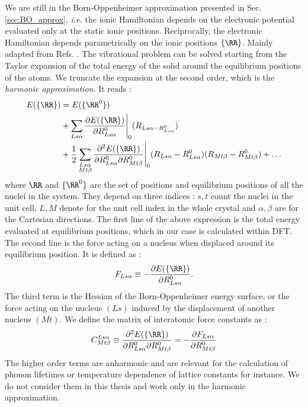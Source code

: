 We are still in the Born-Oppenheimer approximation presented in Sec. \ref{sec:BO_approx}, \textit{i.e.} the ionic Hamiltonian depends on the electronic potential evaluated only at the static ionic positions. Reciprocally, the electronic Hamiltonian depends parametrically on the ionic positions $\{\RR\}$.
Mainly adapted from Refs. \cite{paleari2019first,baroni2001phonons,pereira2017ab}. The vibrational problem can be solved starting from the Taylor expansion of the total energy of the solid around the equilibrium positions of the atoms. We truncate the expansion at the second order, which is the \textit{harmonic approximation}. It reads :
\begin{align}
\begin{split}
	E(\{\RR\}) &=  E(\{\RR^0\}) \\ 
	&+ \sum_{Ls\alpha} \frac{\partial E(\{\RR\})}{\partial R^0_{Ls\alpha}}\Biggr|_{0} (R_{Ls\alpha - R^0_{Ls\alpha}}) \\
	&+ \frac{1}{2} \sum_{\substack{Ls\alpha \\ Mt\beta}} \frac{\partial^2 E(\{\RR\})}{\partial R^0_{Ls\alpha} \partial R^0_{Mt\beta}}\Biggr|_{0} (R_{Ls\alpha} - R^0_{Ls\alpha}) (R_{Mt\beta} - R^0_{Mt\beta}) + \ldots
\end{split}
\end{align}
where ${\RR}$ and $\{\RR^0\}$ are the set of positions and equilibrium positions of all the nuclei in the system. They depend on three indices : $s,t$ count the nuclei in the unit cell, $L,M$ denote for the unit cell index in the whole crystal and $\alpha,\beta$ are for the Cartesian directions. The first line of the above expression is the total energy evaluated at equilibrium positions, which in our case is calculated within \acrshort{DFT}. The second line is the force acting on a nucleus when displaced around its equilibrium position. It is defined as :
\begin{equation}
	F_{Ls\alpha} \equiv -\frac{\partial E(\{ \RR\})}{\partial R^0_{Ls\alpha}}.
\end{equation}
The third term is the Hessian of the Born-Oppenheimer energy surface, or the force acting on the nucleus $(Ls)$ induced by the displacement of another nucleus $(Mt)$. We define the matrix of interatomic force constants as :
\begin{equation}
	C^{Ls\alpha}_{Mt\beta} \equiv \frac{\partial^2 E(\{\RR\})}{\partial R^0_{Ls\alpha} \partial R^0_{Mt\beta}} = -\frac{\partial F_{Ls\alpha}}{\partial R^0_{Mt\beta}}
	\label{eq:IFC_matrix}
\end{equation}
The higher order terms are anharmonic and are relevant for the calculation of phonon lifetimes or temperature dependence of lattice constants for instance. We do not consider them in this thesis and work only in the harmonic approximation.


